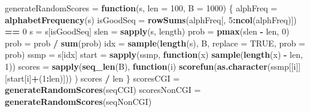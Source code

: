 \documentclass[]{article}
\newenvironment{Shaded}{\begin{snugshade}}{\end{snugshade}}
\newcommand{\KeywordTok}[1]{\textcolor[rgb]{0.13,0.29,0.53}{\textbf{#1}}}
\newcommand{\DataTypeTok}[1]{\textcolor[rgb]{0.13,0.29,0.53}{#1}}
\newcommand{\DecValTok}[1]{\textcolor[rgb]{0.00,0.00,0.81}{#1}}
\newcommand{\StringTok}[1]{\textcolor[rgb]{0.31,0.60,0.02}{#1}}
\newcommand{\OtherTok}[1]{\textcolor[rgb]{0.56,0.35,0.01}{#1}}
\newcommand{\ControlFlowTok}[1]{\textcolor[rgb]{0.13,0.29,0.53}{\textbf{#1}}}
\newcommand{\OperatorTok}[1]{\textcolor[rgb]{0.81,0.36,0.00}{\textbf{#1}}}
\newcommand{\NormalTok}[1]{#1}
\begin{document}
\begin{Shaded}
\begin{Highlighting}[]
\NormalTok{generateRandomScores =}\StringTok{ }\ControlFlowTok{function}\NormalTok{(s, }\DataTypeTok{len =} \DecValTok{100}\NormalTok{, }\DataTypeTok{B =} \DecValTok{1000}\NormalTok{) \{}
\NormalTok{  alphFreq =}\StringTok{ }\KeywordTok{alphabetFrequency}\NormalTok{(s)}
\NormalTok{  isGoodSeq =}\StringTok{ }\KeywordTok{rowSums}\NormalTok{(alphFreq[, }\DecValTok{5}\OperatorTok{:}\KeywordTok{ncol}\NormalTok{(alphFreq)]) }\OperatorTok{==}\StringTok{ }\DecValTok{0}
\NormalTok{  s =}\StringTok{ }\NormalTok{s[isGoodSeq]}
\NormalTok{  slen =}\StringTok{ }\KeywordTok{sapply}\NormalTok{(s, length)}
\NormalTok{  prob =}\StringTok{ }\KeywordTok{pmax}\NormalTok{(slen }\OperatorTok{-}\StringTok{ }\NormalTok{len, }\DecValTok{0}\NormalTok{)}
\NormalTok{  prob =}\StringTok{ }\NormalTok{prob }\OperatorTok{/}\StringTok{ }\KeywordTok{sum}\NormalTok{(prob)}
\NormalTok{  idx  =}\StringTok{ }\KeywordTok{sample}\NormalTok{(}\KeywordTok{length}\NormalTok{(s), B, }\DataTypeTok{replace =} \OtherTok{TRUE}\NormalTok{, }\DataTypeTok{prob =}\NormalTok{ prob)}
\NormalTok{  ssmp =}\StringTok{ }\NormalTok{s[idx]}
\NormalTok{  start =}\StringTok{ }\KeywordTok{sapply}\NormalTok{(ssmp, }\ControlFlowTok{function}\NormalTok{(x) }\KeywordTok{sample}\NormalTok{(}\KeywordTok{length}\NormalTok{(x) }\OperatorTok{-}\StringTok{ }\NormalTok{len, }\DecValTok{1}\NormalTok{))}
\NormalTok{  scores =}\StringTok{ }\KeywordTok{sapply}\NormalTok{(}\KeywordTok{seq_len}\NormalTok{(B), }\ControlFlowTok{function}\NormalTok{(i)}
    \KeywordTok{scorefun}\NormalTok{(}\KeywordTok{as.character}\NormalTok{(ssmp[[i]][start[i]}\OperatorTok{+}\NormalTok{(}\DecValTok{1}\OperatorTok{:}\NormalTok{len)]))}
\NormalTok{  )}
\NormalTok{  scores }\OperatorTok{/}\StringTok{ }\NormalTok{len}
\NormalTok{\}}
\NormalTok{scoresCGI    =}\StringTok{ }\KeywordTok{generateRandomScores}\NormalTok{(seqCGI)}
\NormalTok{scoresNonCGI =}\StringTok{ }\KeywordTok{generateRandomScores}\NormalTok{(seqNonCGI)}
\end{Highlighting}
\end{Shaded}
\end{document}
